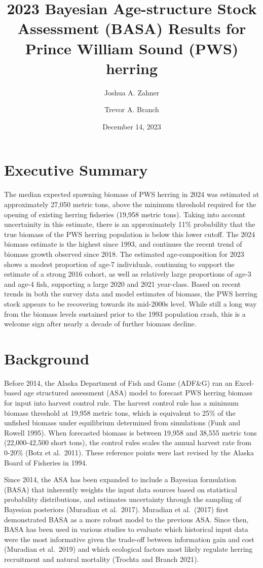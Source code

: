 \documentclass[
  11pt,
]{article}
\title{2023 Bayesian Age-structure Stock Assessment (BASA) Results for
Prince William Sound (PWS) herring}
\author{Joshua A. Zahner \and Trevor A. Branch}
\date{December 14, 2023}
\begin{document}
\maketitle

\hypertarget{executive-summary}{%
\section{Executive Summary}\label{executive-summary}}

The median expected spawning biomass of PWS herring in 2024 was
estimated at approximately 27,050 metric tons, above the minimum
threshold required for the opening of existing herring fisheries (19,958
metric tons). Taking into account uncertainity in this estimate, there
is an approximately 11\% probability that the true biomass of the PWS
herring population is below this lower cutoff. The 2024 biomass estimate
is the highest since 1993, and continues the recent trend of biomass
growth observed since 2018. The estimated age-composition for 2023 shows
a modest proportion of age-7 individuals, continuing to support the
estimate of a strong 2016 cohort, as well as relatively large
proportions of age-3 and age-4 fish, supporting a large 2020 and 2021
year-class. Based on recent trends in both the survey data and model
estimates of biomass, the PWS herring stock appears to be recovering
towards its mid-2000s level. While still a long way from the biomass
levels sustained prior to the 1993 population crash, this is a welcome
sign after nearly a decade of further biomass decline.

\hypertarget{background}{%
\section{Background}\label{background}}

Before 2014, the Alaska Department of Fish and Game (ADF\&G) ran an
Excel-based age structured assessment (ASA) model to forecast PWS
herring biomass for input into harvest control rule. The harvest control
rule has a minimum biomass threshold at 19,958 metric tons, which is
equivalent to 25\% of the unfished biomass under equilibrium determined
from simulations (Funk and Rowell 1995). When forecasted biomass is
between 19,958 and 38,555 metric tons (22,000-42,500 short tons), the
control rules scales the annual harvest rate from 0-20\% (Botz et
al.~2011). These reference points were last revised by the Alaska Board
of Fisheries in 1994.

Since 2014, the ASA has been expanded to include a Bayesian formulation
(BASA) that inherently weights the input data sources based on
statistical probability distributions, and estimates uncertainty through
the sampling of Bayesian posteriors (Muradian et al.~2017). Muradian et
al.~(2017) first demonstrated BASA as a more robust model to the
previous ASA. Since then, BASA has been used in various studies to
evaluate which historical input data were the most informative given the
trade-off between information gain and cost (Muradian et al.~2019) and
which ecological factors most likely regulate herring recruitment and
natural mortality (Trochta and Branch 2021).
\end{document}
